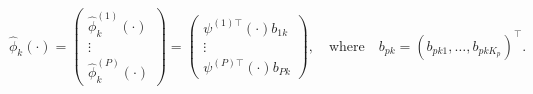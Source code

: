 \begin{equation}
    \widehat{\phi}_k(\cdot) = 
        \begin{pmatrix} 
            \widehat{\phi}_k^{(1)}(\cdot) \\
            \vdots \\
            \widehat{\phi}_k^{(P)}(\cdot)
        \end{pmatrix} = 
        \begin{pmatrix} 
            \psi^{(1) \top}(\cdot) b_{1k} \\
            \vdots \\
            \psi^{(P) \top}(\cdot) b_{Pk}
        \end{pmatrix}, \quad\text{where}\quad
        b_{pk} = \left(b_{p k 1}, \dots, b_{p k K_p} \right)^\top.
\end{equation}

